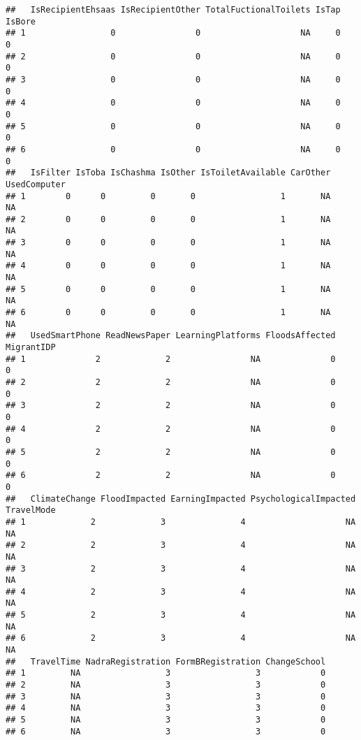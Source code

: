 \documentclass[
]{article}
\begin{document}
\begin{verbatim}
##   IsRecipientEhsaas IsRecipientOther TotalFuctionalToilets IsTap IsBore
## 1                 0                0                    NA     0      0
## 2                 0                0                    NA     0      0
## 3                 0                0                    NA     0      0
## 4                 0                0                    NA     0      0
## 5                 0                0                    NA     0      0
## 6                 0                0                    NA     0      0
##   IsFilter IsToba IsChashma IsOther IsToiletAvailable CarOther UsedComputer
## 1        0      0         0       0                 1       NA           NA
## 2        0      0         0       0                 1       NA           NA
## 3        0      0         0       0                 1       NA           NA
## 4        0      0         0       0                 1       NA           NA
## 5        0      0         0       0                 1       NA           NA
## 6        0      0         0       0                 1       NA           NA
##   UsedSmartPhone ReadNewsPaper LearningPlatforms FloodsAffected MigrantIDP
## 1              2             2                NA              0          0
## 2              2             2                NA              0          0
## 3              2             2                NA              0          0
## 4              2             2                NA              0          0
## 5              2             2                NA              0          0
## 6              2             2                NA              0          0
##   ClimateChange FloodImpacted EarningImpacted PsychologicalImpacted TravelMode
## 1             2             3               4                    NA         NA
## 2             2             3               4                    NA         NA
## 3             2             3               4                    NA         NA
## 4             2             3               4                    NA         NA
## 5             2             3               4                    NA         NA
## 6             2             3               4                    NA         NA
##   TravelTime NadraRegistration FormBRegistration ChangeSchool
## 1         NA                 3                 3            0
## 2         NA                 3                 3            0
## 3         NA                 3                 3            0
## 4         NA                 3                 3            0
## 5         NA                 3                 3            0
## 6         NA                 3                 3            0

\end{verbatim}
\end{document}
